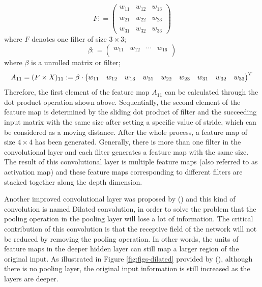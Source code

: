 \documentclass[]{krantz}
\begin{document}
\[ F  : = \begin{pmatrix}
w_{11} & w_{12}  & w_{13}\\ \\
w_{21} & w_{22}  & w_{23} \\ \\
w_{31} & w_{32}  & w_{33}
\end{pmatrix}\]
where \(F\) denotes one filter of size \(3 \times 3\);
\[ \beta  : = \begin{pmatrix}
w_{11} & w_{12} & \cdots & w_{16}\\
\end{pmatrix}\]
where \(\beta\) is a unrolled matrix or filter;
\[ A_{11} = (F \times X)_{11}  : =
\beta \cdot \begin{pmatrix}
w_{11} & w_{12} & w_{13} & w_{21} & w_{22} & w_{23} & w_{31} & w_{32} & w_{33}\\
\end{pmatrix}^{T}\\\]
Therefore, the first element of the feature map \(A_{11}\) can be calculated through the dot product operation shown above. Sequentially, the second element of the feature map is determined by the sliding dot product of filter and the succeeding input matrix with the same size after setting a specific value of stride, which can be considered as a moving distance. After the whole process, a feature map of size \(4 \times 4\) has been generated. Generally, there is more than one filter in the convolutional layer and each filter generates a feature map with the same size. The result of this convolutional layer is multiple feature maps (also referred to as activation map) and these feature maps corresponding to different filters are stacked together along the depth dimension.

Another improved convolutional layer was proposed by (\citet{Kalchbrenner2016NeuralMT}) and this kind of convolution is named Dilated convolution, in order to solve the problem that the pooling operation in the pooling layer will lose a lot of information. The critical contribution of this convolution is that the receptive field of the network will not be reduced by removing the pooling operation. In other words, the units of feature maps in the deeper hidden layer can still map a larger region of the original input. As illustrated in Figure \ref{fig:figs-dilated} provided by (\citet{Oord2016WaveNetAG}), although there is no pooling layer, the original input information is still increased as the layers are deeper.
\end{document}
